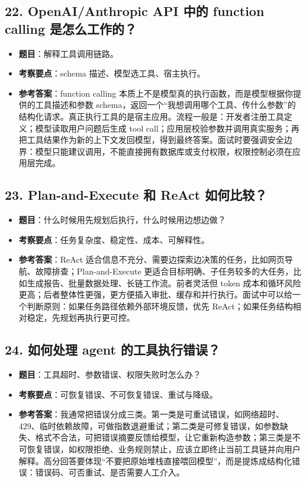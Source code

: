 \subsection{22. OpenAI/Anthropic API 中的 function calling 是怎么工作的？}
\begin{itemize}[leftmargin=2em]
\item \textbf{题目}：解释工具调用链路。
\item \textbf{考察要点}：schema 描述、模型选工具、宿主执行。
\item \textbf{参考答案}：function calling 本质上不是模型真的执行函数，而是模型根据你提供的工具描述和参数 schema，返回一个``我想调用哪个工具、传什么参数''的结构化请求。真正执行工具的是宿主应用。流程一般是：开发者注册工具定义；模型读取用户问题后生成 tool call；应用层校验参数并调用真实服务；再把工具结果作为新的上下文发回模型，得到最终答案。面试时要强调安全边界：模型只能建议调用，不能直接拥有数据库或支付权限，权限控制必须在应用层完成。
\end{itemize}

\subsection{23. Plan-and-Execute 和 ReAct 如何比较？}
\begin{itemize}[leftmargin=2em]
\item \textbf{题目}：什么时候用先规划后执行，什么时候用边想边做？
\item \textbf{考察要点}：任务复杂度、稳定性、成本、可解释性。
\item \textbf{参考答案}：ReAct 适合信息不充分、需要边探索边决策的任务，比如网页导航、故障排查；Plan-and-Execute 更适合目标明确、子任务较多的大任务，比如生成报告、批量数据处理、长链工作流。前者灵活但 token 成本和循环风险更高；后者整体性更强，更方便插入审批、缓存和并行执行。面试中可以给一个判断原则：如果任务路径依赖外部环境反馈，优先 ReAct；如果任务结构相对稳定，先规划再执行更可控。
\end{itemize}

\subsection{24. 如何处理 agent 的工具执行错误？}
\begin{itemize}[leftmargin=2em]
\item \textbf{题目}：工具超时、参数错误、权限失败时怎么办？
\item \textbf{考察要点}：可恢复错误、不可恢复错误、重试与降级。
\item \textbf{参考答案}：我通常把错误分成三类。第一类是可重试错误，如网络超时、429、临时依赖故障，可做指数退避重试；第二类是可修复错误，如参数缺失、格式不合法，可把错误摘要反馈给模型，让它重新构造参数；第三类是不可恢复错误，如权限拒绝、业务规则禁止，应该立即终止当前工具链并向用户解释。高分回答要体现``不要把原始堆栈直接喂回模型''，而是提炼成结构化错误：错误码、可否重试、是否需要人工介入。
\end{itemize}


